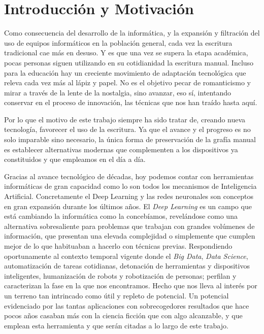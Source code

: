 \chapter{Introducción y Motivación}
Como consecuencia del desarrollo de la informática, y la expansión y
filtración del uso de equipos informáticos en la población general,
cada vez la escritura tradicional cae más en desuso. Y es que una
vez se supera la etapa académica, pocas personas siguen utilizando
en su cotidianidad la escritura manual. Incluso para la educación
hay un creciente movimiento de adaptación tecnológica que releva
cada vez más al lápiz y papel.\newline
No es el objetivo pecar de romanticismo y mirar a través de la lente
de la nostalgia, sino avanzar, eso sí, intentando conservar en el proceso
de innovación, las técnicas que nos han traído hasta aquí.

Por lo que el motivo de este trabajo siempre ha sido tratar de,
creando nueva tecnología, favorecer el uso de la escritura.
Ya que el avance y el progreso es no solo imparable sino necesario,
la única forma de preservación de la grafía manual es establecer
alternativas modernas que complementen a los dispositivos ya
constituidos y que empleamos en el día a día.

Gracias al avance tecnológico de décadas, hoy podemos contar con
herramientas informáticas de gran capacidad como lo son todos
los mecanismos de Inteligencia Artificial. Concretamente el Deep
Learning y las redes neuronales son conceptos en gran expansión
durante los últimos años.
{\color{migris} El \textit{Deep Learning} es un campo que está cambiando
la informática como la concebíamos, revelándose como una alternativa
sobresaliente para problemas que trabajan con grandes volúmenes de
información, que presentan una elevada complejidad o simplemente
que cumplen mejor de lo que habituaban a hacerlo con técnicas
previas. Respondiendo oportunamente al contexto temporal vigente
donde el \textit{Big Data}, \textit{Data Science}, automatización
de tareas cotidianas, detonación de herramientas y dispositivos
inteligentes, humanización de robots y robotización de personas;
perfilan y caracterizan la fase en la que nos encontramos.
Hecho que nos lleva al interés por un terreno tan intrincado
como útil y repleto de potencial. Un potencial evidenciado por
las tantas aplicaciones con sobrecogedores resultados que hace pocos
años casaban más con la ciencia ficción que con algo alcanzable, y que
emplean esta herramienta y que serán citadas a lo largo de este trabajo.
}

